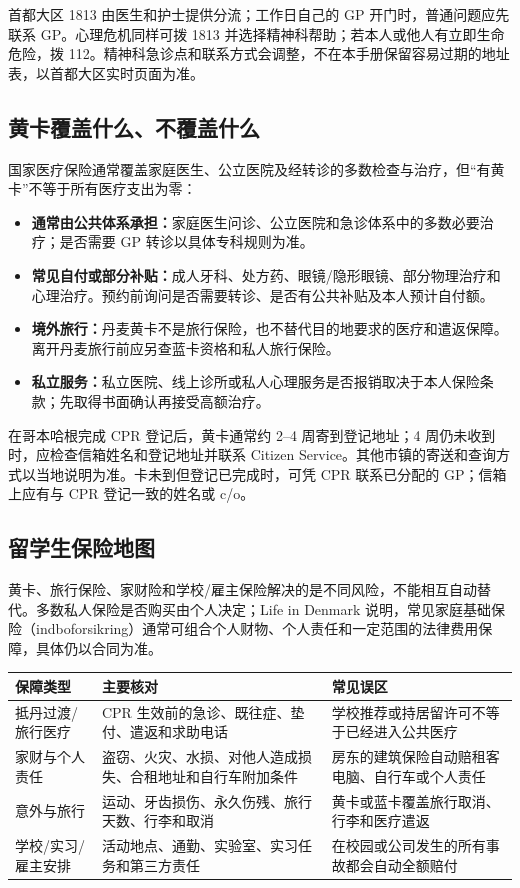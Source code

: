 首都大区 1813 由医生和护士提供分流；工作日自己的 GP 开门时，普通问题应先联系 GP。心理危机同样可拨 1813 并选择精神科帮助；若本人或他人有立即生命危险，拨 112。精神科急诊点和联系方式会调整，不在本手册保留容易过期的地址表，以首都大区实时页面为准。

\subsection{黄卡覆盖什么、不覆盖什么}

国家医疗保险通常覆盖家庭医生、公立医院及经转诊的多数检查与治疗，但“有黄卡”不等于所有医疗支出为零：

\begin{itemize}[leftmargin=2em,itemsep=3pt]
  \item \textbf{通常由公共体系承担：}家庭医生问诊、公立医院和急诊体系中的多数必要治疗；是否需要 GP 转诊以具体专科规则为准。
  \item \textbf{常见自付或部分补贴：}成人牙科、处方药、眼镜/隐形眼镜、部分物理治疗和心理治疗。预约前询问是否需要转诊、是否有公共补贴及本人预计自付额。
  \item \textbf{境外旅行：}丹麦黄卡不是旅行保险，也不替代目的地要求的医疗和遣返保障。离开丹麦旅行前应另查蓝卡资格和私人旅行保险。
  \item \textbf{私立服务：}私立医院、线上诊所或私人心理服务是否报销取决于本人保险条款；先取得书面确认再接受高额治疗。
\end{itemize}

在哥本哈根完成 CPR 登记后，黄卡通常约 2--4 周寄到登记地址；4 周仍未收到时，应检查信箱姓名和登记地址并联系 Citizen Service。其他市镇的寄送和查询方式以当地说明为准。卡未到但登记已完成时，可凭 CPR 联系已分配的 GP；信箱上应有与 CPR 登记一致的姓名或 c/o。

\subsection{留学生保险地图}

黄卡、旅行保险、家财险和学校/雇主保险解决的是不同风险，不能相互自动替代。多数私人保险是否购买由个人决定；Life in Denmark 说明，常见家庭基础保险（indboforsikring）通常可组合个人财物、个人责任和一定范围的法律费用保障，具体仍以合同为准。

\noindent\begin{tabularx}{\textwidth}{@{}p{}X X@{}}
\toprule
\textbf{保障类型} & \textbf{主要核对} & \textbf{常见误区} \\
\midrule
抵丹过渡/旅行医疗 & CPR 生效前的急诊、既往症、垫付、遣返和求助电话 & 学校推荐或持居留许可不等于已经进入公共医疗 \\
家财与个人责任 & 盗窃、火灾、水损、对他人造成损失、合租地址和自行车附加条件 & 房东的建筑保险自动赔租客电脑、自行车或个人责任 \\
意外与旅行 & 运动、牙齿损伤、永久伤残、旅行天数、行李和取消 & 黄卡或蓝卡覆盖旅行取消、行李和医疗遣返 \\
学校/实习/雇主安排 & 活动地点、通勤、实验室、实习任务和第三方责任 & 在校园或公司发生的所有事故都会自动全额赔付 \\
\bottomrule
\end{tabularx}

